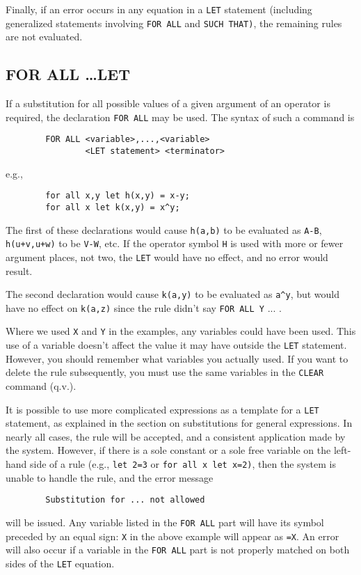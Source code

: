 Finally, if an error occurs in any equation in a {\tt LET} statement
(including generalized statements involving {\tt FOR ALL} and {\tt SUCH
THAT)}, the remaining rules are not evaluated.

\subsection{FOR ALL \ldots LET}  
If a substitution for all possible values of a given argument of an
operator is required, the declaration {\tt FOR ALL} may be used. The
syntax of such a command is
\begin{verbatim}
        FOR ALL <variable>,...,<variable>
                <LET statement> <terminator>
\end{verbatim}
e.g.,
\begin{verbatim}
        for all x,y let h(x,y) = x-y;
        for all x let k(x,y) = x^y;
\end{verbatim}
The first of these declarations would cause {\tt h(a,b)} to be evaluated
as {\tt A-B}, {\tt h(u+v,u+w)} to be {\tt V-W}, etc.  If the operator
symbol {\tt H} is used with more or fewer argument places, not two, the
{\tt LET} would have no effect, and no error would result.

The second declaration would cause {\tt k(a,y)} to be evaluated as
{\tt a\^{ }y}, but would have no effect on {\tt k(a,z)} since the rule
didn't say {\tt FOR ALL Y} ... .

Where we used {\tt X} and {\tt Y} in the examples, any variables could
have been used.  This use of a variable doesn't affect the value it may
have outside the {\tt LET} statement.  However, you should remember what
variables you actually used.  If you want to delete the rule subsequently,
you must use the same variables in the {\tt CLEAR} command (q.v.).

It is possible to use more complicated expressions as a template for a
{\tt LET} statement, as explained in the section on substitutions for
general expressions.  In nearly all cases, the rule will be accepted, and
a consistent application made by the system.  However, if there is a sole
constant or a sole free variable on the left-hand side of a rule (e.g.,
{\tt let 2=3} or {\tt for all x let x=2)}, then the system is unable to
handle the rule, and the error message
\begin{verbatim}
        Substitution for ... not allowed
\end{verbatim}
will be issued.  Any variable listed in the {\tt FOR ALL} part will have
its symbol preceded by an equal sign: {\tt X} in the above example will
appear as {\tt =X}.  An error will also occur if a variable in the
{\tt FOR ALL} part is not properly matched on both sides of the {\tt LET}
equation.

